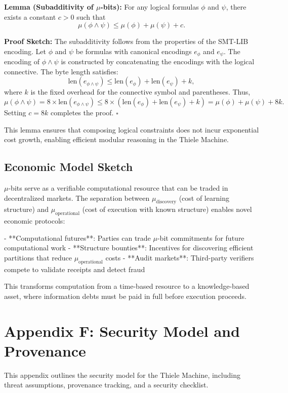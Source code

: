 \documentclass[11pt]{article}
\begin{document}
\textbf{Lemma (Subadditivity of $\mu$-bits):} For any logical formulas $\phi$ and $\psi$, there exists a constant $c > 0$ such that
\[
\mu(\phi \land \psi) \leq \mu(\phi) + \mu(\psi) + c.
\]

\textbf{Proof Sketch:} The subadditivity follows from the properties of the SMT-LIB encoding. Let $\phi$ and $\psi$ be formulas with canonical encodings $e_\phi$ and $e_\psi$. The encoding of $\phi \land \psi$ is constructed by concatenating the encodings with the logical connective. The byte length satisfies:
\[
\text{len}(e_{\phi \land \psi}) \leq \text{len}(e_\phi) + \text{len}(e_\psi) + k,
\]
where $k$ is the fixed overhead for the connective symbol and parentheses. Thus,
\[
\mu(\phi \land \psi) = 8 \times \text{len}(e_{\phi \land \psi}) \leq 8 \times (\text{len}(e_\phi) + \text{len}(e_\psi) + k) = \mu(\phi) + \mu(\psi) + 8k.
\]
Setting $c = 8k$ completes the proof. \hfill $\square$

This lemma ensures that composing logical constraints does not incur exponential cost growth, enabling efficient modular reasoning in the Thiele Machine.

\subsection{Economic Model Sketch}

$\mu$-bits serve as a verifiable computational resource that can be traded in decentralized markets. The separation between $\mu_{\text{discovery}}$ (cost of learning structure) and $\mu_{\text{operational}}$ (cost of execution with known structure) enables novel economic protocols:

- **Computational futures**: Parties can trade $\mu$-bit commitments for future computational work
- **Structure bounties**: Incentives for discovering efficient partitions that reduce $\mu_{\text{operational}}$ costs
- **Audit markets**: Third-party verifiers compete to validate receipts and detect fraud

This transforms computation from a time-based resource to a knowledge-based asset, where information debts must be paid in full before execution proceeds.

\section{Appendix F: Security Model and Provenance}\label{appendix:security}

This appendix outlines the security model for the Thiele Machine, including threat assumptions, provenance tracking, and a security checklist.
\end{document}
